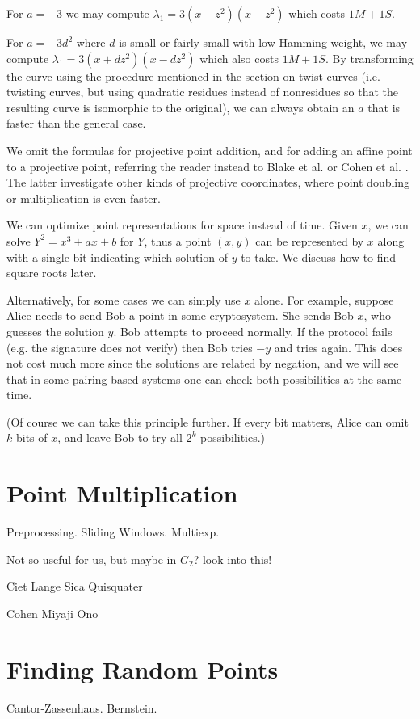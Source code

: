 For $a=-3$ we may compute $\lambda_1 = 3(x+z^2)(x-z^2)$ which costs
$1M + 1S$.

For $a = -3 d^2$ where $d$ is small or fairly small with low Hamming weight,
we may compute $\lambda_1 = 3(x+dz^2)(x-dz^2)$ which also costs $1M + 1S$.
By transforming the curve using the procedure mentioned in the section on
twist curves (i.e. twisting curves, but using quadratic residues instead
of nonresidues so that the resulting curve is isomorphic to the original),
we can always obtain an $a$ that is faster than the general case.

We omit the formulas for projective point addition, and for adding
an affine point to a projective point, referring the reader instead
to Blake et al. or Cohen et al. \cite{stuff}.
The latter investigate other kinds of projective coordinates, where point
doubling or multiplication is even faster.

We can optimize point representations for space instead of time.
Given $x$, we can solve $Y^2 = x^3 + ax + b$ for $Y$, thus
a point $(x,y)$ can be represented by $x$ along with a single bit indicating
which solution of $y$ to take. We discuss how to find square roots later.

Alternatively, for some cases we can simply use $x$ alone. For example,
suppose Alice needs to send Bob a point in some cryptosystem. She sends
Bob $x$, who guesses the solution $y$. Bob attempts to proceed normally.
If the protocol fails (e.g. the signature does not verify) then Bob tries
$-y$ and tries again. This does not cost much more since the solutions are
related by negation, and we will see that in some pairing-based systems
one can check both possibilities at the same time.

(Of course we can take this principle further. If every bit matters, Alice can
omit $k$ bits of $x$, and leave Bob to try all $2^k$ possibilities.)

\section {Point Multiplication}

Preprocessing. Sliding Windows. Multiexp.

Not so useful for us, but maybe in $G_2$? look into this!

Ciet Lange Sica Quisquater

Cohen Miyaji Ono

\section {Finding Random Points}

Cantor-Zassenhaus.
Bernstein.
